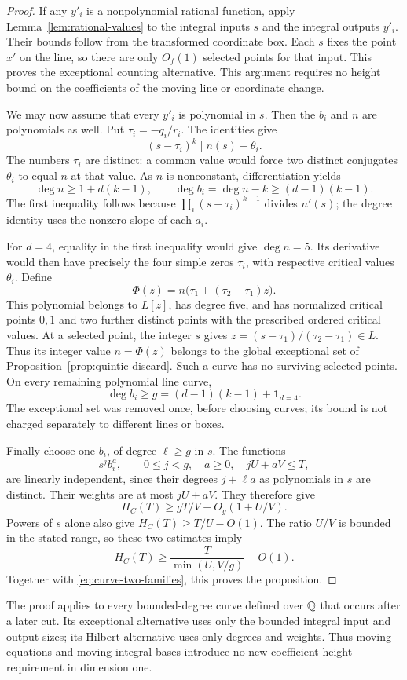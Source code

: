 \begin{proof}
If any $y'_i$ is a nonpolynomial rational function, apply
Lemma~\ref{lem:rational-values} to the integral inputs $s$ and the
integral outputs $y'_i$.  Their bounds follow from the transformed
coordinate box.  Each $s$ fixes the point $x'$ on the line, so there
are only $O_f(1)$ selected points for that input.  This proves the
exceptional counting alternative.  This argument requires no height
bound on the coefficients of the moving line or coordinate change.

We may now assume that every $y'_i$ is polynomial in $s$.  Then the
$b_i$ and $n$ are polynomials as well.  Put $\tau_i=-q_i/r_i$.
The identities give
\[
 (s-\tau_i)^k\mid n(s)-\theta_i.
\]
The numbers $\tau_i$ are distinct: a common value would force two
distinct conjugates $\theta_i$ to equal $n$ at that value.  As $n$ is
nonconstant, differentiation yields
\begin{equation}\label{eq:curve-polynomial-degrees}
 \deg n\ge1+d(k-1),\qquad
 \deg b_i=\deg n-k\ge(d-1)(k-1).
\end{equation}
The first inequality follows because
$\prod_i(s-\tau_i)^{k-1}$ divides $n'(s)$; the degree identity uses
the nonzero slope of each $a_i$.

For $d=4$, equality in the first inequality would give $\deg n=5$.
Its derivative would then have precisely the four simple zeros
$\tau_i$, with respective critical values $\theta_i$.  Define
\[
 \Phi(z)=n\bigl(\tau_1+(\tau_2-\tau_1)z\bigr).
\]
This polynomial belongs to $L[z]$, has degree five, and has normalized
critical points $0,1$ and two further distinct points with the
prescribed ordered critical values.  At a selected point, the integer
$s$ gives $z=(s-\tau_1)/(\tau_2-\tau_1)\in L$.  Thus its integer value
$n=\Phi(z)$ belongs to the global exceptional set of
Proposition~\ref{prop:quintic-discard}.  Such a curve has no surviving
selected points.  On every remaining polynomial line curve,
\[
 \deg b_i\ge g=(d-1)(k-1)+\mathbf 1_{d=4}.
\]
The exceptional set was removed once, before choosing curves; its
bound is not charged separately to different lines or boxes.

Finally choose one $b_i$, of degree $\ell\ge g$ in $s$.  The functions
\[
 s^j b_i^a,\qquad 0\le j<g,\quad a\ge0,\quad jU+aV\le T,
\]
are linearly independent, since their degrees $j+\ell a$ as
polynomials in $s$ are distinct.  Their weights are at most $jU+aV$.
They therefore give
\[
 H_C(T)\ge gT/V-O_g(1+U/V).
\]
Powers of $s$ alone also give $H_C(T)\ge T/U-O(1)$.  The ratio $U/V$
is bounded in the stated range, so these two estimates imply
\[
 H_C(T)\ge
 \frac{T}{\min(U,V/g)}-O(1).
\]
Together with \eqref{eq:curve-two-families}, this proves the proposition.
\end{proof}

The proof applies to every bounded-degree curve defined over $\mathbb Q$
that occurs after a later cut.  Its exceptional alternative uses only the bounded
integral input and output sizes; its Hilbert alternative uses only
degrees and weights.  Thus moving equations and moving integral bases
introduce no new coefficient-height requirement in dimension one.
